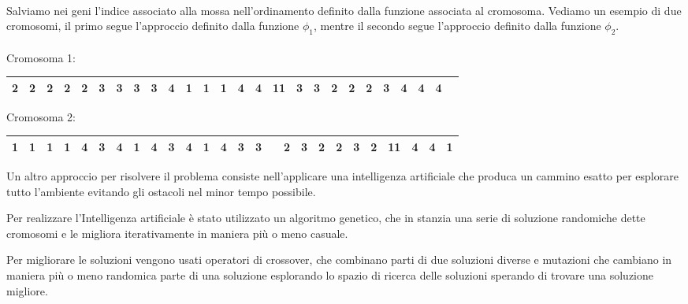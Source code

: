 \documentclass{article}
\begin{document}
\paragraph{}
Salviamo nei geni l'indice associato alla mossa nell'ordinamento definito dalla funzione associata al cromosoma. Vediamo un esempio di due cromosomi, il primo segue l'approccio definito dalla funzione $\phi_1$, mentre il secondo segue l'approccio definito dalla funzione $\phi_2$.

\paragraph{}
Cromosoma 1:
\begin{center}
\begin{adjustbox}{width=\columnwidth,center}
    \begin{tabular}{ | c | c | c | c | c | c | c | c| c | c | c | c | c | c | c | c| c | c | c | c | c | c | c | c | c | c | } 
  \hline
   2 & 2 & 2 & 2 & 2 & 3 & 3 &3&3&4&1&1&1&4&4&11&3&3&2&2&2&3&4&4&4\\
  \hline
\end{tabular}
\end{adjustbox}
\end{center}

Cromosoma 2:
\begin{center}
\begin{adjustbox}{width=\columnwidth,center}
    \begin{tabular}{ | c | c | c | c | c | c | c | c| c | c | c | c | c | c | c | c| c | c | c | c | c | c | c | c | c | c | } 
  \hline
   1 & 1 & 1 & 1 & 4 & 3 & 4 & 1 & 4 & 3 & 4 & 1 & 4 & 3 & 3 & & 2 & 3 & 2 & 2 & 3 & 2 & 11 & 4 & 4 & 1\\
  \hline
\end{tabular}
\end{adjustbox}
\end{center}

Un altro approccio per risolvere il problema consiste nell'applicare una intelligenza artificiale che produca un cammino esatto per esplorare tutto l'ambiente evitando gli ostacoli nel minor tempo possibile.

Per realizzare l'Intelligenza artificiale è stato utilizzato un algoritmo genetico, che in stanzia una serie di soluzione randomiche dette cromosomi e le migliora iterativamente in maniera più o meno casuale.

Per migliorare le soluzioni vengono usati operatori di crossover, che combinano parti di due soluzioni diverse e mutazioni che cambiano in maniera più o meno randomica parte di una soluzione esplorando lo spazio di ricerca delle soluzioni sperando di trovare una soluzione migliore.
\end{document}
